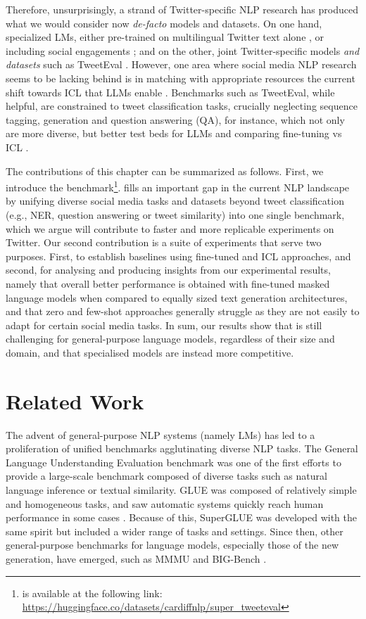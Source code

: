 Therefore, unsurprisingly, a strand of Twitter-specific NLP research has produced what we would consider now \textit{de-facto} models and datasets. On one hand, specialized LMs, either pre-trained on multilingual Twitter text alone \cite{nguyen2020bertweet,delucia-etal-2022-bernice,barbieri-etal-2022-xlm}, or including social engagements \cite{zhang2022twhin}; and on the other, joint Twitter-specific models \textit{and datasets} such as TweetEval \cite{barbieri-etal-2020-tweeteval}. However, one area where social media NLP research seems to be lacking behind is in matching with appropriate resources the current shift towards \ac{ICL} that \ac{LLMs} enable \cite{min2022metaicl}. Benchmarks such as TweetEval, while helpful, are constrained to tweet classification tasks, crucially neglecting sequence tagging, generation and question answering (QA), for instance, which not only are more diverse, but better test beds for \ac{LLMs} and comparing fine-tuning vs ICL \cite{liu2022few}.

The contributions of this chapter can be summarized as follows. First, we introduce the {\DATASET} benchmark\footnote{{\DATASET} is available at the following link: \url{https://huggingface.co/datasets/cardiffnlp/super_tweeteval}}. {\DATASET} fills an important gap in the current NLP landscape by unifying diverse social media tasks and datasets beyond tweet classification (e.g., NER, question answering or tweet similarity) into one single benchmark, which we argue will contribute to faster and more replicable experiments on Twitter. Our second contribution is a suite of experiments that serve two purposes. First, to establish baselines using fine-tuned and ICL approaches, and second, for analysing and producing insights from our experimental results, namely that overall better performance is obtained with fine-tuned masked language models when compared to equally sized text generation architectures, and that zero and few-shot approaches generally struggle as they are not easily to adapt for certain social media tasks. 
In sum, our results show that {\DATASET} is still challenging for general-purpose language models, regardless of their size and domain, and that specialised models are instead  more competitive. 

\section{Related Work}
The advent of general-purpose NLP systems (namely LMs) has led to a proliferation of unified benchmarks agglutinating diverse NLP tasks. The General Language Understanding Evaluation benchmark \cite[GLUE]{wang-etal-2018-glue} was one of the first efforts to provide a large-scale benchmark composed of diverse tasks such as natural language inference or textual similarity. GLUE was composed of relatively simple and homogeneous tasks, and saw automatic systems quickly reach human performance in some cases \cite{yang2019xlnet}. Because of this, SuperGLUE \cite{wang2019superglue} was developed with the same spirit but included a wider range of tasks and settings. Since then, other general-purpose benchmarks for language models, especially those of the new generation, have emerged, such as MMMU \cite{hendryckstest2021} and BIG-Bench \cite{srivastava2022beyond}.

